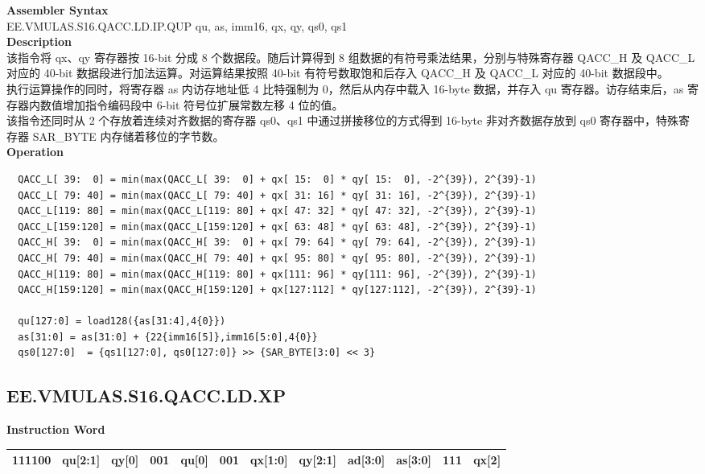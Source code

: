 \textbf{Assembler Syntax} \\
EE.VMULAS.S16.QACC.LD.IP.QUP qu, as, imm16, qx, qy, qs0, qs1 \\
\textbf{Description} \\
该指令将 qx、qy 寄存器按 16-bit 分成 8 个数据段。随后计算得到 8 组数据的有符号乘法结果，分别与特殊寄存器 QACC\_H 及 QACC\_L 对应的 40-bit 数据段进行加法运算。对运算结果按照 40-bit 有符号数取饱和后存入 QACC\_H 及 QACC\_L 对应的 40-bit 数据段中。\\
执行运算操作的同时，将寄存器 as 内访存地址低 4 比特强制为 0，然后从内存中载入 16-byte 数据，并存入 qu 寄存器。访存结束后，as 寄存器内数值增加指令编码段中 6-bit 符号位扩展常数左移 4 位的值。\\
该指令还同时从 2 个存放着连续对齐数据的寄存器 qs0、qs1 中通过拼接移位的方式得到 16-byte 非对齐数据存放到 qs0 寄存器中，特殊寄存器 SAR\_BYTE 内存储着移位的字节数。\\
\textbf{Operation}
\begin{lstlisting}
  QACC_L[ 39:  0] = min(max(QACC_L[ 39:  0] + qx[ 15:  0] * qy[ 15:  0], -2^{39}), 2^{39}-1)
  QACC_L[ 79: 40] = min(max(QACC_L[ 79: 40] + qx[ 31: 16] * qy[ 31: 16], -2^{39}), 2^{39}-1)
  QACC_L[119: 80] = min(max(QACC_L[119: 80] + qx[ 47: 32] * qy[ 47: 32], -2^{39}), 2^{39}-1)
  QACC_L[159:120] = min(max(QACC_L[159:120] + qx[ 63: 48] * qy[ 63: 48], -2^{39}), 2^{39}-1)
  QACC_H[ 39:  0] = min(max(QACC_H[ 39:  0] + qx[ 79: 64] * qy[ 79: 64], -2^{39}), 2^{39}-1)
  QACC_H[ 79: 40] = min(max(QACC_H[ 79: 40] + qx[ 95: 80] * qy[ 95: 80], -2^{39}), 2^{39}-1)
  QACC_H[119: 80] = min(max(QACC_H[119: 80] + qx[111: 96] * qy[111: 96], -2^{39}), 2^{39}-1)
  QACC_H[159:120] = min(max(QACC_H[159:120] + qx[127:112] * qy[127:112], -2^{39}), 2^{39}-1)

  qu[127:0] = load128({as[31:4],4{0}})
  as[31:0] = as[31:0] + {22{imm16[5]},imm16[5:0],4{0}}
  qs0[127:0]  = {qs1[127:0], qs0[127:0]} >> {SAR_BYTE[3:0] << 3}
\end{lstlisting}

\clearpage
\subsection{EE.VMULAS.S16.QACC.LD.XP}\label{instruction:EEVMULASS16QACCLDXP}
\setlength\tabcolsep{6pt}
\textbf{Instruction Word} \\
\begin{tabular}{|c|c|c|c|c|c|c|c|c|c|c|c|}
	\hline
	111100 & qu[2:1] & qy[0] & 001 & qu[0] & 001 & qx[1:0] & qy[2:1] & ad[3:0] & as[3:0] & 111 & qx[2] \\
	\hline
\end{tabular}


